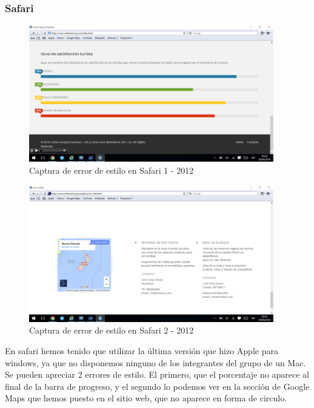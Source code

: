 \subsubsection{Safari}
\begin{figure}[h]
	\centering
	\includegraphics[width=0.95\textwidth]{./Fotos/safari-capture.png}
	\caption{Captura de error de estilo en Safari 1 - 2012}
	\label{fig: ejemplo}
\end{figure}
\begin{figure}[h]
	\centering
	\includegraphics[width=0.95\textwidth]{./Fotos/safari2-capture.png}
	\caption{Captura de error de estilo en Safari 2 - 2012}
	\label{fig: ejemplo}
\end{figure}
En safari hemos tenido que utilizar la última versión que hizo Apple para windows, ya que no disponemos ninguno de los integrantes del grupo de un Mac. Se pueden apreciar 2 errores de estilo. El primero, que el porcentaje no aparece al final de la barra de progreso, y el segundo lo podemos ver en la sección de Google Maps que hemos puesto en el sitio web, que no aparece en forma de circulo. 
